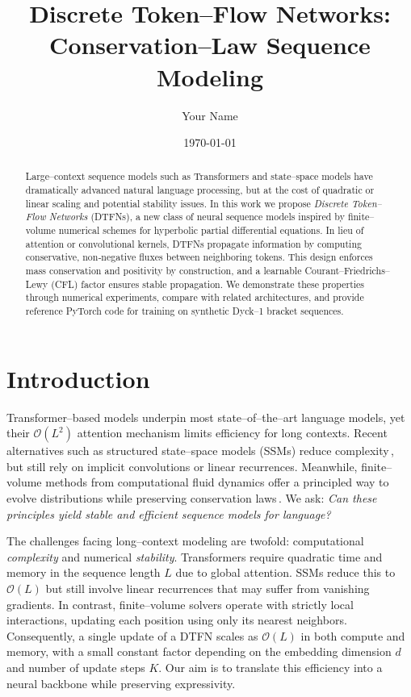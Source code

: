 \documentclass[10pt]{article}
\title{Discrete Token--Flow Networks: Conservation--Law Sequence Modeling}
\author{Your Name}
\date{\today}
\begin{document}
\maketitle

\begin{abstract}
Large–context sequence models such as Transformers and state–space models have
dramatically advanced natural language processing, but at the cost of quadratic
or linear scaling and potential stability issues. In this work we propose
\emph{Discrete Token–Flow Networks} (DTFNs), a new class of neural sequence
models inspired by finite–volume numerical schemes for hyperbolic partial
differential equations. In lieu of attention or convolutional kernels, DTFNs
propagate information by computing conservative, non‑negative fluxes between
neighboring tokens. This design enforces mass conservation and positivity by
construction, and a learnable Courant–Friedrichs–Lewy (CFL) factor ensures
stable propagation. We demonstrate these properties through numerical
experiments, compare with related architectures, and provide reference
PyTorch code for training on synthetic Dyck--1 bracket sequences.
\end{abstract}

\section{Introduction}
Transformer–based models underpin most state–of–the–art language models, yet
their $\mathcal{O}(L^2)$ attention mechanism limits efficiency for long contexts.
Recent alternatives such as structured state–space models (SSMs) reduce
complexity\,\cite{gu2021combining,gu2022efficiently}, but still rely on implicit
convolutions or linear recurrences. Meanwhile, finite–volume methods from
computational fluid dynamics offer a principled way to evolve distributions
while preserving conservation laws\,\cite{leveque2002finite}. We ask: \emph{Can
these principles yield stable and efficient sequence models for language?}

The challenges facing long–context modeling are twofold: computational
\emph{complexity} and numerical \emph{stability}. Transformers require
quadratic time and memory in the sequence length $L$ due to global attention.
SSMs reduce this to $\mathcal{O}(L)$ but still involve linear recurrences that
may suffer from vanishing gradients. In contrast, finite–volume solvers
operate with strictly local interactions, updating each position using only
its nearest neighbors. Consequently, a single update of a DTFN scales as
$\mathcal{O}(L)$ in both compute and memory, with a small constant factor
depending on the embedding dimension $d$ and number of update steps $K$.
Our aim is to translate this efficiency into a neural backbone while
preserving expressivity.
\end{document}
